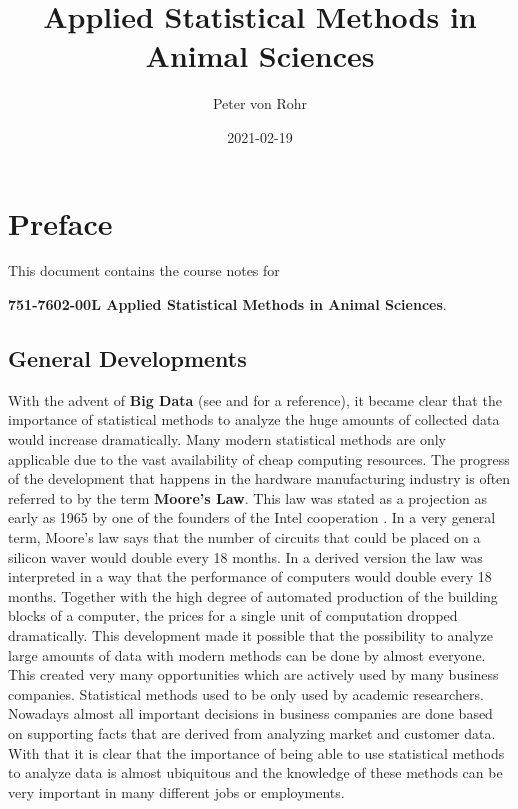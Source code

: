 \documentclass[
]{book}
\title{Applied Statistical Methods in Animal Sciences}
\author{Peter von Rohr}
\date{2021-02-19}
\theoremstyle{definition}
\theoremstyle{definition}
\theoremstyle{definition}
\theoremstyle{remark}
\begin{document}
\maketitle

{
\setcounter{tocdepth}{1}
\tableofcontents
}
\hypertarget{preface}{%
\chapter*{Preface}\label{preface}}

This document contains the course notes for

\textbf{751-7602-00L Applied Statistical Methods in Animal Sciences}.

\hypertarget{general-developments}{%
\section*{General Developments}\label{general-developments}}

With the advent of \textbf{Big Data} (see \citep{Wikipedia2019} and \citep{Mashey1998} for a reference), it became clear that the importance of statistical methods to analyze the huge amounts of collected data would increase dramatically. Many modern statistical methods are only applicable due to the vast availability of cheap computing resources. The progress of the development that happens in the hardware manufacturing industry is often referred to by the term \textbf{Moore's Law}. This law was stated as a projection as early as 1965 by one of the founders of the Intel cooperation \citep{Moore1965}. In a very general term, Moore's law says that the number of circuits that could be placed on a silicon waver would double every 18 months. In a derived version the law was interpreted in a way that the performance of computers would double every 18 months. Together with the high degree of automated production of the building blocks of a computer, the prices for a single unit of computation dropped dramatically. This development made it possible that the possibility to analyze large amounts of data with modern methods can be done by almost everyone. This created very many opportunities which are actively used by many business companies. Statistical methods used to be only used by academic researchers. Nowadays almost all important decisions in business companies are done based on supporting facts that are derived from analyzing market and customer data. With that it is clear that the importance of being able to use statistical methods to analyze data is almost ubiquitous and the knowledge of these methods can be very important in many different jobs or employments.
\end{document}
